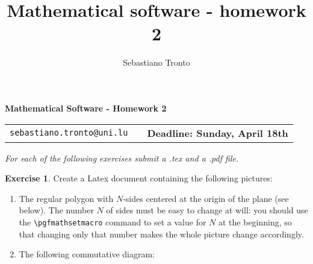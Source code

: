 \documentclass[12pt,a4paper]{article}
\title{Mathematical software - homework 2}
\author{Sebastiano Tronto}
\theoremstyle{definition}
\newtheorem{ex}{Exercise}
\theoremstyle{definition}
\begin{document}
\noindent\hrulefill

\begin{center}
\Huge{\textbf{Mathematical Software - Homework 2}}
\end{center}

\noindent\hrulefill
\begin{center}
\begin{tabular}{lcr}
\texttt{sebastiano.tronto@uni.lu} & \qquad \qquad \qquad \qquad &
\textbf{Deadline: Sunday, April 18th}
\end{tabular}
\end{center}

\vspace{1cm}

\begin{center}
  \emph{\large
    For each of the following exercises submit a .tex and a .pdf file.
  }
\end{center}

\vspace{1cm}

\begin{ex}
  Create a Latex document containing the following pictures:
  \begin{enumerate}[label=(\alph*)]
    \item The regular polygon with $N$-sides centered at the origin of the
          plane (see below).
          The number $N$ of sides must be easy to change at will: you should
          use the \texttt{\textbackslash pgfmathsetmacro} command to set a
          value for $N$ at the beginning, so that changing only that number
          makes the whole picture change accordingly.
      \begin{center}
      \end{center}
    \item The following commutative diagram:
  \end{enumerate}
\end{ex}
\end{document}
